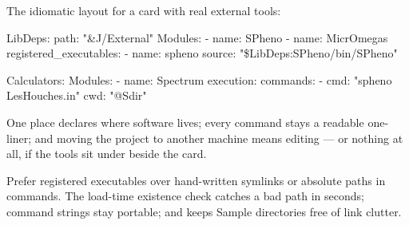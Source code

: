 The idiomatic layout for a card with real external tools:

\begin{yamlwin}
LibDeps:
  path: "&J/External"
  Modules:
    - name: SPheno
    - name: MicrOmegas
  registered_executables:
    - name: spheno
      source: "\${LibDeps:SPheno}/bin/SPheno"

Calculators:
  Modules:
    - name: Spectrum
      execution:
        commands:
          - cmd: "spheno LesHouches.in"
            cwd: "@Sdir"
\end{yamlwin}

One place declares where software lives; every command stays a readable one-liner; and
moving the project to another machine means editing  --- or nothing at
all, if the tools sit under  beside the card.

\begin{jtip}
Prefer registered executables over hand-written symlinks or absolute paths in commands.
The load-time existence check catches a bad path in seconds; command strings stay
portable; and  keeps Sample directories free of link clutter.
\end{jtip}
